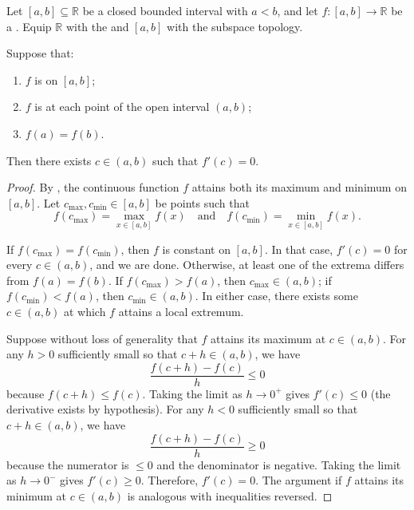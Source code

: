 \begin{theorem} \label{theorem:rolles_theorem_for_differentiable_functions_vanishing_at_endpoints}
    Let $[a, b] \subseteq \mathbb{R}$ be a closed bounded interval with $a < b$, and let $f : [a, b] \to \mathbb{R}$ be a . Equip $\mathbb{R}$ with the  and $[a, b]$ with the subspace topology.

    Suppose that:
    \begin{enumerate}
        \item $f$ is  on $[a, b]$;
        \item $f$ is  at each point of the open interval $(a, b)$;
        \item $f(a) = f(b)$.
    \end{enumerate}
    Then there exists $c \in (a, b)$ such that $f'(c) = 0$.
\end{theorem}

\begin{proof}
    By , the continuous function $f$ attains both its maximum and minimum on $[a, b]$. Let $c_{\max}, c_{\min} \in [a, b]$ be points such that
    $$f(c_{\max}) = \max_{x \in [a,b]} f(x) \quad \text{and} \quad f(c_{\min}) = \min_{x \in [a,b]} f(x).$$

    If $f(c_{\max}) = f(c_{\min})$, then $f$ is constant on $[a, b]$. In that case, $f'(c) = 0$ for every $c \in (a, b)$, and we are done. Otherwise, at least one of the extrema differs from $f(a) = f(b)$. If $f(c_{\max}) > f(a)$, then $c_{\max} \in (a, b)$; if $f(c_{\min}) < f(a)$, then $c_{\min} \in (a, b)$. In either case, there exists some $c \in (a, b)$ at which $f$ attains a local extremum.

    Suppose without loss of generality that $f$ attains its maximum at $c \in (a, b)$. For any $h > 0$ sufficiently small so that $c + h \in (a, b)$, we have
    $$\frac{f(c+h) - f(c)}{h} \leq 0$$
    because $f(c+h) \leq f(c)$. Taking the limit as $h \to 0^+$ gives $f'(c) \leq 0$ (the derivative exists by hypothesis). For any $h < 0$ sufficiently small so that $c + h \in (a, b)$, we have
    $$\frac{f(c+h) - f(c)}{h} \geq 0$$
    because the numerator is $\leq 0$ and the denominator is negative. Taking the limit as $h \to 0^-$ gives $f'(c) \geq 0$. Therefore, $f'(c) = 0$. The argument if $f$ attains its minimum at $c \in (a, b)$ is analogous with inequalities reversed.
\end{proof}
